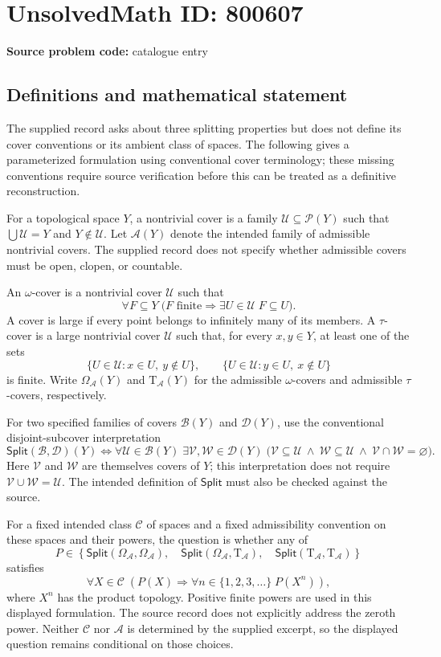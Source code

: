 \documentclass[11pt]{article}
\begin{document}
\section*{UnsolvedMath ID: 800607}
\textbf{Source problem code:} catalogue entry
\subsection{Definitions and mathematical statement}
The supplied record asks about three splitting properties but does not define its cover conventions or its ambient class of spaces. The following gives a parameterized formulation using conventional cover terminology; these missing conventions require source verification before this can be treated as a definitive reconstruction.

For a topological space \(Y\), a nontrivial cover is a family \(\mathcal U\subseteq\mathcal P(Y)\) such that \(\bigcup\mathcal U=Y\) and \(Y\notin\mathcal U\). Let \(\mathcal A(Y)\) denote the intended family of admissible nontrivial covers. The supplied record does not specify whether admissible covers must be open, clopen, or countable.

An \(\omega\)-cover is a nontrivial cover \(\mathcal U\) such that
\[
\forall F\subseteq Y\;\bigl(F\text{ finite}\Longrightarrow\exists U\in\mathcal U\; F\subseteq U\bigr).
\]
A cover is large if every point belongs to infinitely many of its members. A \(\tau\)-cover is a large nontrivial cover \(\mathcal U\) such that, for every \(x,y\in Y\), at least one of the sets
\[
\{U\in\mathcal U:x\in U,\ y\notin U\},\qquad
\{U\in\mathcal U:y\in U,\ x\notin U\}
\]
is finite. Write \(\Omega_{\mathcal A}(Y)\) and \(\mathrm T_{\mathcal A}(Y)\) for the admissible \(\omega\)-covers and admissible \(\tau\)-covers, respectively.

For two specified families of covers \(\mathcal B(Y)\) and \(\mathcal D(Y)\), use the conventional disjoint-subcover interpretation
\[
\mathsf{Split}(\mathcal B,\mathcal D)(Y)
\iff
\forall\mathcal U\in\mathcal B(Y)\;\exists\mathcal V,\mathcal W\in\mathcal D(Y)\;
\bigl(\mathcal V\subseteq\mathcal U\ \land\ \mathcal W\subseteq\mathcal U\ \land\ \mathcal V\cap\mathcal W=\varnothing\bigr).
\]
Here \(\mathcal V\) and \(\mathcal W\) are themselves covers of \(Y\); this interpretation does not require \(\mathcal V\cup\mathcal W=\mathcal U\). The intended definition of \(\mathsf{Split}\) must also be checked against the source.

For a fixed intended class \(\mathcal C\) of spaces and a fixed admissibility convention on these spaces and their powers, the question is whether any of
\[
P\in\left\{
\mathsf{Split}(\Omega_{\mathcal A},\Omega_{\mathcal A}),\quad
\mathsf{Split}(\Omega_{\mathcal A},\mathrm T_{\mathcal A}),\quad
\mathsf{Split}(\mathrm T_{\mathcal A},\mathrm T_{\mathcal A})
\right\}
\]
satisfies
\[
\forall X\in\mathcal C\;\left(P(X)\Longrightarrow
\forall n\in\{1,2,3,\ldots\}\;P(X^n)\right),
\]
where \(X^n\) has the product topology. Positive finite powers are used in this displayed formulation. The source record does not explicitly address the zeroth power. Neither \(\mathcal C\) nor \(\mathcal A\) is determined by the supplied excerpt, so the displayed question remains conditional on those choices.
\end{document}
